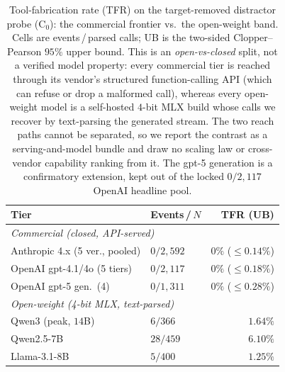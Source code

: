 %
\begin{table}[t]
\caption{Tool-fabrication rate (TFR) on the target-removed distractor
probe ($\mathrm{C}_0$): the commercial frontier vs.\ the open-weight band.
Cells are events\,/\,parsed calls; UB is the two-sided Clopper--Pearson
$95\%$ upper bound. This is an \emph{open-vs-closed} split, not a verified
model property: every commercial tier is reached through its vendor's
structured function-calling API (which can refuse or drop a malformed
call), whereas every open-weight model is a self-hosted $4$-bit MLX build
whose calls we recover by text-parsing the generated stream. The two reach
paths cannot be separated, so we report the contrast as a serving-and-model
bundle and draw no scaling law or cross-vendor capability ranking from it.
The gpt-5 generation is a confirmatory extension, kept out of the locked
$0/2{,}117$ OpenAI headline pool.}
\label{tab:frontier}
\centering
\small
\setlength{\tabcolsep}{6pt}
\begin{tabular}{llr}
\toprule
Tier & Events\,/\,$N$ & TFR (UB) \\
\midrule
\multicolumn{3}{l}{\emph{Commercial (closed, API-served)}} \\
Anthropic 4.x (5 ver., pooled) & $0/2{,}592$ & $0\%$ ($\leq\!0.14\%$) \\
OpenAI gpt-4.1/4o (5 tiers)    & $0/2{,}117$ & $0\%$ ($\leq\!0.18\%$) \\
OpenAI gpt-5 gen.\ (4)         & $0/1{,}311$ & $0\%$ ($\leq\!0.28\%$) \\
\midrule
\multicolumn{3}{l}{\emph{Open-weight (4-bit MLX, text-parsed)}} \\
Qwen3 (peak, $14$B)            & $6/366$  & $1.64\%$ \\
Qwen2.5-7B                     & $28/459$ & $6.10\%$ \\
Llama-3.1-8B                   & $5/400$  & $1.25\%$ \\
\bottomrule
\end{tabular}
\end{table}
